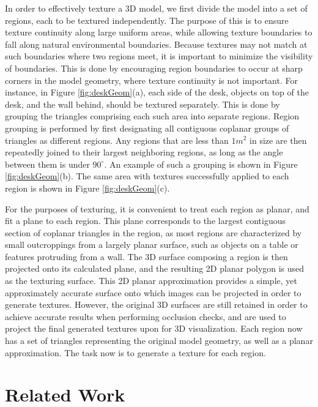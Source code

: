 \documentclass[]{spie}  %
\begin{document}
In order to effectively texture a 3D model, we first divide the model
into a set of regions, each to be textured independently. The purpose
of this is to ensure texture continuity along large uniform areas,
while allowing texture boundaries to fall along natural environmental
boundaries. Because textures may not match at such boundaries where
two regions meet, it is important to minimize the visibility of
boundaries. This is done by encouraging region boundaries to occur at
sharp corners in the model geometry, where texture continuity is not
important. For instance, in Figure \ref{fig:deskGeom}(a), each side of
the desk, objects on top of the desk, and the wall behind, should be
textured separately. This is done by grouping the triangles comprising
each such area into separate regions. Region grouping is performed by
first designating all contiguous coplanar groups of triangles as
different regions. Any regions that are less than $1 m^2$ in size are
then repeatedly joined to their largest neighboring regions, as long
as the angle between them is under $90^{\circ}$. An example of such a
grouping is shown in Figure \ref{fig:deskGeom}(b). The same area with
textures successfully applied to each region is shown in Figure
\ref{fig:deskGeom}(c).

For the purposes of texturing, it is convenient to treat each region
as planar, and fit a plane to each region. This plane corresponds to
the largest contiguous section of coplanar triangles in the region, as
most regions are characterized by small outcroppings from a largely
planar surface, such as objects on a table or features protruding from
a wall. The 3D surface composing a region is then projected onto its
calculated plane, and the resulting 2D planar polygon is used as the
texturing surface. This 2D planar approximation provides a simple, yet
approximately accurate surface onto which images can be projected in
order to generate textures. However, the original 3D surfaces are
still retained in order to achieve accurate results when performing
occlusion checks, and are used to project the final generated textures
upon for 3D visualization. Each region now has a set of triangles
representing the original model geometry, as well as a planar
approximation. The task now is to generate a texture for each region.

\section{Related Work}
\label{sec:relatedWork}
\end{document}
